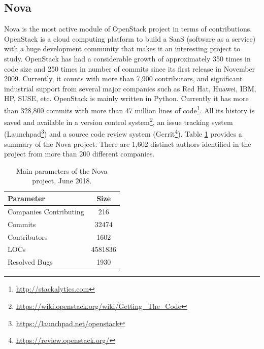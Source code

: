 \documentclass[a4paper, 12pt]{book}
\begin{document}
\subsection{Nova}

Nova is the most active module of OpenStack project in terms of contributions. OpenStack is a cloud computing platform to build a SaaS (software as a service) with a huge development community that makes it an interesting project to study. OpenStack has had a considerable growth of approximately 350 times in code size and 250 times in number of commits since its first release in November 2009.  Currently, it counts with more than 7,900 contributors, and significant industrial support from several major companies such as Red Hat, Huawei, IBM, HP, SUSE, etc. OpenStack is mainly written in Python. Currently it has more than 328,800 commits with more than 47 million lines of code\footnote{\url{http://stackalytics.com}}. All its history is saved and available in a version control system\footnote{\url{https://wiki.openstack.org/wiki/Getting_The_Code}}, an issue tracking system (Launchpad\footnote{\url{https://launchpad.net/openstack}}) and a source code review system (Gerrit\footnote{\url{https://review.openstack.org/}}).  Table \ref{tablenova} provides a summary of the Nova project. There are 1,602 distinct authors identified in the project from more than 200 different companies. 

 \begin{table}[!t]
\renewcommand{\arraystretch}{0.8}
\caption{Main parameters of the Nova project, June 2018.}
\label{tablenova}
\centering

\begin{tabular}{|l|c|}
\hline
Parameter & Size \\
\hline
\hline
Companies Contributing &  216 \\
\hline
Commits & 32474 \\
\hline
Contributors & 1602 \\
\hline
LOCs & 4581836\\
\hline
Resolved Bugs &1930\\
\hline
\end{tabular}
\end{table}
\end{document}
